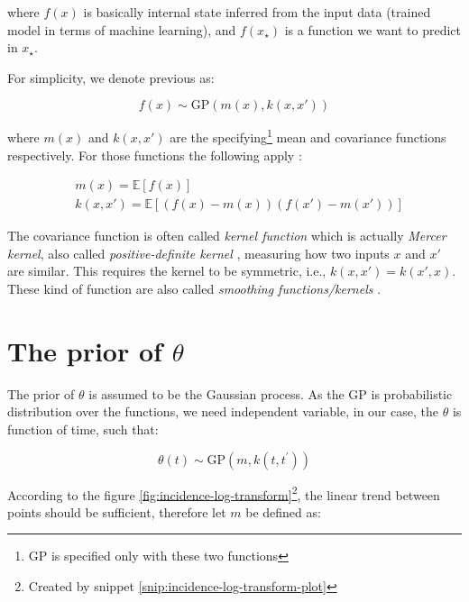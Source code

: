 \documentclass[
  digital, %
  oneside, %
  lof,     %
  lot,     %
]{fithesis4}
\begin{document}
where $f(x)$ is basically internal state inferred from the input data (trained model in terms of machine learning), and $f(x_\star)$ is a function we want to predict in $x_\star$.

For simplicity, we denote previous as:

\begin{equation}
  f(x) \sim \text{GP} \left( m \left( x \right), k \left( x, x' \right) \right)
\end{equation}

where $m \left( x \right)$ and $k\left( x, x' \right)$ are 
the specifying\footnote{GP is specified only with these two functions} mean and
covariance functions respectively.
For those functions the following apply \cite{rasmussen2004}:

\begin{equation}
\begin{split}
  & m(x) = \mathbb{E} \left[ f(x) \right] \\
  & k \left( x, x' \right) = \mathbb{E} \left[ 
    \left( f \left( x \right) - m \left( x \right) \right)
    \left( f \left( x' \right) - m \left( x' \right) \right)
  \right]
\end{split}
\end{equation}

The covariance function is often called \textit{kernel function} which is actually \textit{Mercer kernel}, also called \textit{positive-definite kernel} \cite{murphy2021}, measuring how two inputs $x$ and $x'$ are similar.
This requires the kernel to be symmetric, i.e., $k \left( x, x' \right) = k \left( x', x \right)$.
These kind of function are also called \textit{smoothing functions/kernels} \cite{martin2016}.


\section{The prior of \texorpdfstring{$\theta$}{Lg}}

The prior of $\theta$ is assumed to be the Gaussian process. 
As the GP is probabilistic distribution over the functions, we need independent variable, in our case, the $\theta$ is function of time, such that:

\begin{equation}
  \theta(t) \sim \text{GP}(m, k(t, t^\prime))
\end{equation}

According to the figure \ref{fig:incidence-log-transform}\footnote{Created by snippet \ref{snip:incidence-log-transform-plot}}, the linear trend between points should be sufficient, therefore let $m$ be defined as:
\end{document}
